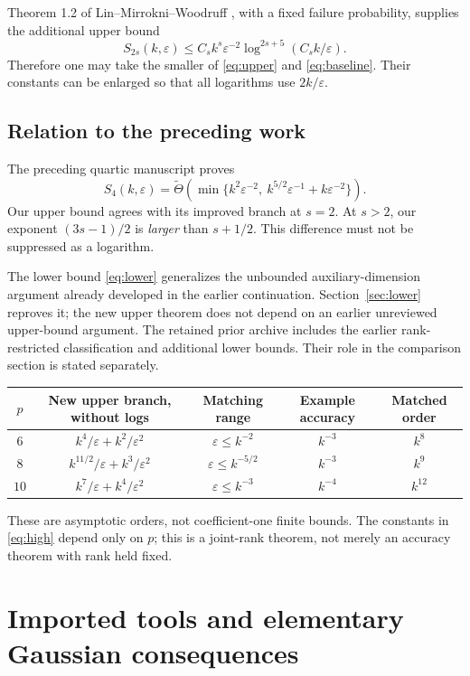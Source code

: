 \documentclass[11pt]{article}
\theoremstyle{remark}\newtheorem{remark}[theorem]{Remark}
\newcommand{\eps}{\varepsilon}\newcommand{\Sym}{\operatorname{Sym}}
\begin{document}
Theorem 1.2 of Lin--Mirrokni--Woodruff \cite{lmw}, with a fixed failure probability, supplies the additional upper bound
\begin{equation}\label{eq:baseline}
 S_{2s}(k,\eps)\le C_s k^s\eps^{-2}\log^{2s+5}(C_s k/\eps).
\end{equation}
Therefore one may take the smaller of \eqref{eq:upper} and \eqref{eq:baseline}. Their constants can be enlarged so that all logarithms use $2k/\eps$.

\subsection{Relation to the preceding work}
The preceding quartic manuscript \cite{prior} proves
\[
 S_4(k,\eps)=\widetilde\Theta\!\left(\min\{k^2\eps^{-2},\ k^{5/2}\eps^{-1}+k\eps^{-2}\}\right).
\]
Our upper bound agrees with its improved branch at $s=2$. At $s>2$, our exponent $(3s-1)/2$ is \emph{larger} than $s+1/2$. This difference must not be suppressed as a logarithm.

The lower bound \eqref{eq:lower} generalizes the unbounded auxiliary-dimension argument already developed in the earlier continuation. Section~\ref{sec:lower} reproves it; the new upper theorem does not depend on an earlier unreviewed upper-bound argument. The retained prior archive includes the earlier rank-restricted classification and additional lower bounds. Their role in the comparison section is stated separately.

\begin{center}
\begin{tabular}{ccccc}
\toprule
$p$ & New upper branch, without logs & Matching range & Example accuracy & Matched order\\
\midrule
$6$ & $k^4/\eps+k^2/\eps^2$ & $\eps\le k^{-2}$ & $k^{-3}$ & $k^8$\\
$8$ & $k^{11/2}/\eps+k^3/\eps^2$ & $\eps\le k^{-5/2}$ & $k^{-3}$ & $k^9$\\
$10$ & $k^7/\eps+k^4/\eps^2$ & $\eps\le k^{-3}$ & $k^{-4}$ & $k^{12}$\\
\bottomrule
\end{tabular}
\end{center}
These are asymptotic orders, not coefficient-one finite bounds. The constants in \eqref{eq:high} depend only on $p$; this is a joint-rank theorem, not merely an accuracy theorem with rank held fixed.

\section{Imported tools and elementary Gaussian consequences}\label{sec:tools}
\end{document}
